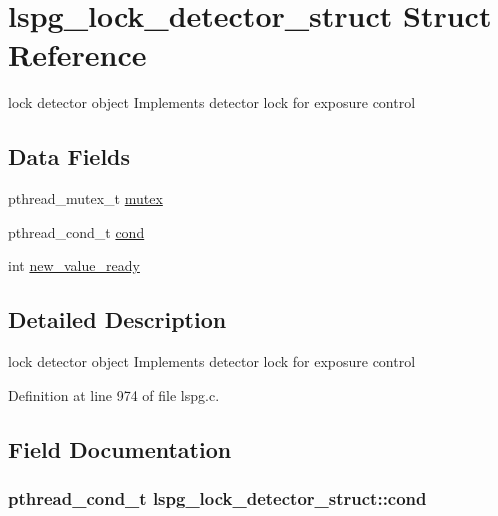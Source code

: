 \hypertarget{structlspg__lock__detector__struct}{\section{lspg\-\_\-lock\-\_\-detector\-\_\-struct Struct Reference}
\label{structlspg__lock__detector__struct}
}


lock detector object Implements detector lock for exposure control  


\subsection*{Data Fields}
\begin{DoxyCompactItemize}
\item 
pthread\-\_\-mutex\-\_\-t \hyperlink{structlspg__lock__detector__struct_ab5ab5534b376a8fbafdd0b54cec4483c}{mutex}
\item 
pthread\-\_\-cond\-\_\-t \hyperlink{structlspg__lock__detector__struct_adc90c859665dccc8717219e824cba0b8}{cond}
\item 
int \hyperlink{structlspg__lock__detector__struct_a62373414b815fe178edd8522b3bd4d78}{new\-\_\-value\-\_\-ready}
\end{DoxyCompactItemize}


\subsection{Detailed Description}
lock detector object Implements detector lock for exposure control 

Definition at line 974 of file lspg.\-c.



\subsection{Field Documentation}
\hypertarget{structlspg__lock__detector__struct_adc90c859665dccc8717219e824cba0b8}{
\subsubsection[{cond}]{\setlength{\rightskip}{0pt plus 5cm}pthread\-\_\-cond\-\_\-t lspg\-\_\-lock\-\_\-detector\-\_\-struct\-::cond}}\label{structlspg__lock__detector__struct_adc90c859665dccc8717219e824cba0b8}


